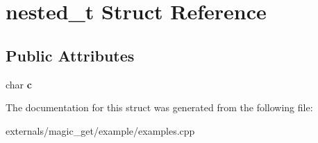 \hypertarget{structnested__t}{}\section{nested\+\_\+t Struct Reference}
\label{structnested__t}
\subsection*{Public Attributes}
\begin{DoxyCompactItemize}
\item 
\mbox{\label{structnested__t_a16c0de7e2823302d93416b9640e37b5b}} 
char {\bfseries c}
\end{DoxyCompactItemize}


The documentation for this struct was generated from the following file\+:\begin{DoxyCompactItemize}
\item 
externals/magic\+\_\+get/example/examples.\+cpp\end{DoxyCompactItemize}
